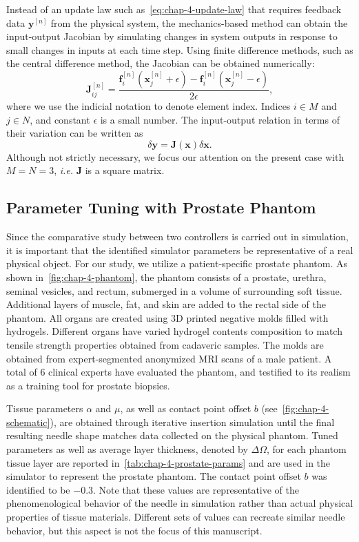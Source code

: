Instead of an update law such as~\cref{eq:chap-4-update-law} that requires feedback data $\mathbf{y}^{[n]}$ from the physical system, the mechanics-based method can obtain the input-output Jacobian by simulating changes in system outputs in response to small changes in inputs at each time step. Using finite difference methods, such as the central difference method, the Jacobian can be obtained numerically:
\begin{equation}
  \mathbf{J}_{ij}^{[n]} = \frac{\mathbf{f}_i^{[n]}(\mathbf{x}_j^{[n]} + \epsilon) - \mathbf{f}_i^{[n]}(\mathbf{x}_j^{[n]} - \epsilon)}{2\epsilon},\label{eq:chap-4-central-difference}
\end{equation}
where we use the indicial notation to denote element index. Indices $i \in M$ and $j \in N$, and constant $\epsilon$ is a small number. The input-output relation in terms of their variation can be written as
\begin{equation}
\delta \mathbf{y} = \mathbf{J}(\mathbf{x})\delta \mathbf{x}.\label{eq:chap-4-variation}
\end{equation}
Although not strictly necessary, we focus our attention on the present case with $M = N = 3$, \textit{i.e.} $\mathbf{J}$ is a square matrix.

\subsection{Parameter Tuning with Prostate Phantom}
\label{sec:parameter_tuning}
Since the comparative study between two controllers is carried out in simulation, it is important that the identified simulator parameters be representative of a real physical object. For our study, we utilize a patient-specific prostate phantom. As shown in~\cref{fig:chap-4-phantom}, the phantom consists of a prostate, urethra, seminal vesicles, and rectum, submerged in a volume of surrounding soft tissue. Additional layers of muscle, fat, and skin are added to the rectal side of the phantom. All organs are created using 3D printed negative molds filled with hydrogels. Different organs have varied hydrogel contents composition to match tensile strength properties obtained from cadaveric samples. The molds are obtained from expert-segmented anonymized MRI scans of a male patient. A total of 6 clinical experts have evaluated the phantom, and testified to its realism as a training tool for prostate biopsies. 

Tissue parameters $\alpha$ and $\mu$, as well as contact point offset $b$ (see~\cref{fig:chap-4-schematic}), are obtained through iterative insertion simulation until the final resulting needle shape matches data collected on the physical phantom. Tuned parameters as well as average layer thickness, denoted by $\Delta\Omega$, for each phantom tissue layer are reported in~\cref{tab:chap-4-prostate-params} and are used in the simulator to represent the prostate phantom. The contact point offset $b$ was identified to be $-0.3$. Note that these values are representative of the phenomenological behavior of the needle in simulation rather than actual physical properties of tissue materials. Different sets of values can recreate similar needle behavior, but this aspect is not the focus of this manuscript.

